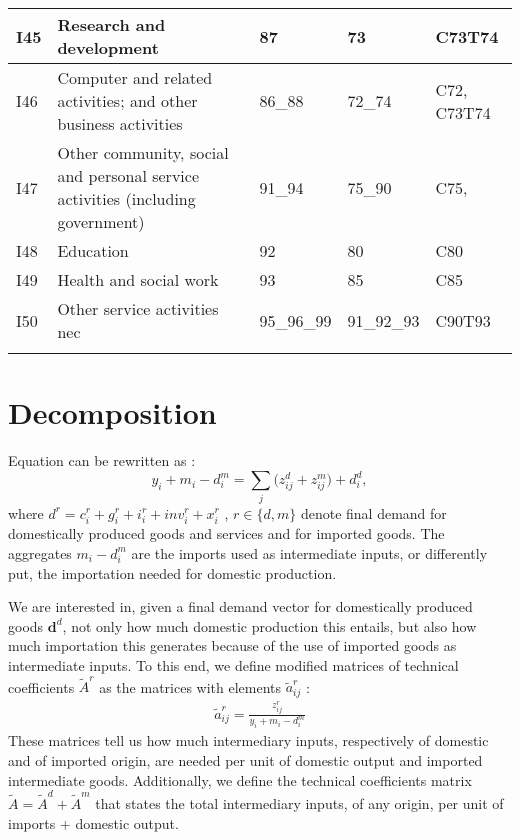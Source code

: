 \documentclass[12pt,english]{article}
\begin{document}
\begin{table}[ht]
\begin{adjustbox}{width=\textwidth}
\begin{tabular}{lp{500pt}lll}
		I45 & Research and development  & 87 & 73 & C73T74 \\ \midrule
		I46 & Computer and related activities; and other business activities & 86\_88 & 72\_74 & C72, C73T74 \\ \midrule
		I47 & Other community, social and personal service activities (including government) & 91\_94 & 75\_90 & C75,  \\ \midrule
		I48 & Education & 92 & 80 & C80 \\ \midrule
		I49 & Health and social work & 93 & 85 & C85 \\ \midrule
		I50 & Other service activities nec & 95\_96\_99 & 91\_92\_93 & C90T93 \\
		\arrayrulecolor{black}\bottomrule	
	\end{tabular}
	\end{adjustbox}
	\thispagestyle{empty}
\end{table}

\clearpage
\section{Decomposition}

Equation \label{allUSes} can be rewritten as :
\begin{equation}
y_i + m_i - d_i^m= \sum_j \big(z_{ij}^d + z_{ij}^m \big) + d_i^d, 
\end{equation}
where $d^r = c^r_i + g_i^r + i_i^r + inv_i^r + x_i^r$ , $r\in\{d,m\}$ denote final demand for domestically produced goods and services and for imported goods. The aggregates $m_i - d_i^m$ are the imports used as intermediate inputs, or differently put, the importation needed for domestic production.

We are interested in, given a final demand vector for domestically produced goods $\boldsymbol{d}^d$, not only how much domestic production this entails, but also how much importation this generates because of the use of imported goods as intermediate inputs. To this end, we define modified matrices of technical coefficients $\tilde{A}^r$ as the matrices with elements $\tilde{a}^r_{ij}$ : 
\begin{align}
\tilde{a}^r_{ij} = \frac{z_{ij}^r}{y_i + m_i - d_i^m} \label{defAtilde}
\end{align}
These matrices tell us how much intermediary inputs, respectively of domestic and of imported origin, are needed per unit of domestic output and imported intermediate goods. Additionally, we define the technical coefficients matrix $\tilde{A}= \tilde{A}^d + \tilde{A}^m$ that states the total intermediary inputs, of any origin, per unit of imports + domestic output.
\end{document}

